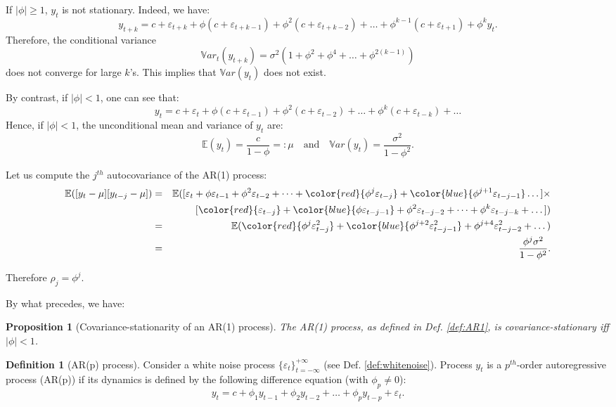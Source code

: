 \documentclass[
  12pt,
]{book}
\newtheorem{proposition}{Proposition}[chapter]
\theoremstyle{definition}
\newtheorem{definition}{Definition}[chapter]
\theoremstyle{definition}
\theoremstyle{definition}
\theoremstyle{definition}
\theoremstyle{remark}
\begin{document}
If \(|\phi|\ge1\), \(y_t\) is not stationary. Indeed, we have:
\[
y_{t+k} = c + \varepsilon_{t+k} + \phi  ( c + \varepsilon_{t+k-1})+ \phi^2  ( c + \varepsilon_{t+k-2})+ \dots + \phi^{k-1}  ( c + \varepsilon_{t+1}) + \phi^k y_t.
\]
Therefore, the conditional variance
\[
\mathbb{V}ar_t(y_{t+k}) = \sigma^2(1 + \phi^2 + \phi^4 + \dots + \phi^{2(k-1)})
\]
does not converge for large \(k\)'s. This implies that \(\mathbb{V}ar(y_{t})\) does not exist.

By contrast, if \(|\phi| < 1\), one can see that:
\[
y_t = c + \varepsilon_t + \phi  ( c + \varepsilon_{t-1})+ \phi^2  ( c + \varepsilon_{t-2})+ \dots + \phi^k  ( c + \varepsilon_{t-k}) + \dots
\]
Hence, if \(|\phi| < 1\), the unconditional mean and variance of \(y_t\) are:
\[
\mathbb{E}(y_t) = \frac{c}{1-\phi} =: \mu \quad \mbox{and} \quad \mathbb{V}ar(y_t) = \frac{\sigma^2}{1-\phi^2}.
\]

Let us compute the \(j^{th}\) autocovariance of the AR(1) process:
\begin{eqnarray*}
\mathbb{E}([y_{t} - \mu][y_{t-j} - \mu]) &=& \mathbb{E}([\varepsilon_t + \phi  \varepsilon_{t-1}+ \phi^2 \varepsilon_{t-2} + \dots + \color{red}{\phi^j \varepsilon_{t-j}} + \color{blue}{\phi^{j+1} \varepsilon_{t-j-1}} \dots]\times \\
&&[\color{red}{\varepsilon_{t-j}} + \color{blue}{\phi \varepsilon_{t-j-1}} + \phi^2 \varepsilon_{t-j-2} + \dots + \phi^k \varepsilon_{t-j-k} + \dots])\\
&=& \mathbb{E}(\color{red}{\phi^j \varepsilon_{t-j}^2}+\color{blue}{\phi^{j+2} \varepsilon_{t-j-1}^2}+\phi^{j+4} \varepsilon_{t-j-2}^2+\dots)\\
&=& \frac{\phi^j \sigma^2}{1 - \phi^2}.
\end{eqnarray*}

Therefore \(\rho_j = \phi^j\).

By what precedes, we have:

\begin{proposition}[Covariance-stationarity of an AR(1) process]
\protect\hypertarget{prp:statioAR1}{}\label{prp:statioAR1}The AR(1) process, as defined in Def. \ref{def:AR1}, is covariance-stationary iff \(|\phi|<1\).
\end{proposition}

\begin{definition}[AR(p) process]
\protect\hypertarget{def:ARp}{}\label{def:ARp}Consider a white noise process \(\{\varepsilon_t\}_{t = -\infty}^{+\infty}\) (see Def. \ref{def:whitenoise}). Process \(y_t\) is a \(p^{th}\)-order autoregressive process (AR(p)) if its dynamics is defined by the following difference equation (with \(\phi_p \ne 0\)):
\begin{equation}
y_t = c + \phi_1 y_{t-1} + \phi_2 y_{t-2} + \dots + \phi_p y_{t-p} + \varepsilon_t.\label{eq:AR}
\end{equation}
\end{definition}
\end{document}
